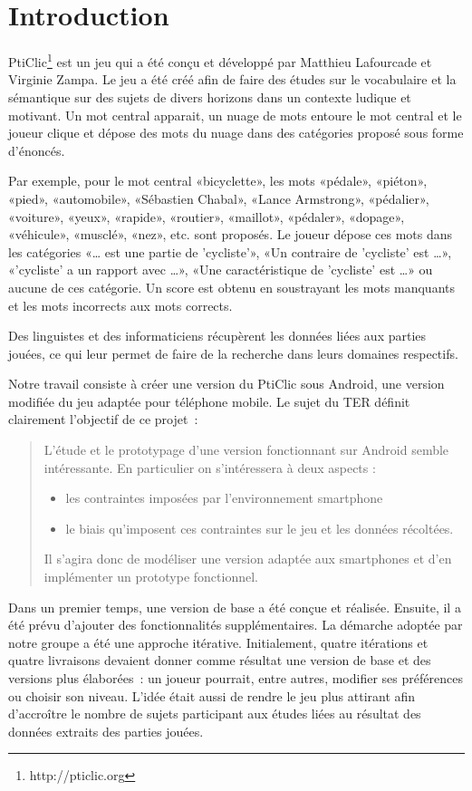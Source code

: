 \documentclass[a4paper,11pt,french]{article}
\def\android{Android\texttrademark{}}
\begin{document}
\section{Introduction}

PtiClic\footnote{http://pticlic.org} est un jeu qui a été conçu et développé par Matthieu Lafourcade et Virginie Zampa. Le jeu a été créé afin de faire des études sur le vocabulaire et la sémantique sur des sujets de divers horizons dans un contexte ludique et motivant. Un mot central apparait, un nuage de mots entoure le mot central et le joueur clique et dépose des mots du nuage dans des catégories proposé sous forme d'énoncés. 

Par exemple, pour le mot central «bicyclette», les mots «pédale», «piéton», «pied», «automobile», «Sébastien Chabal», «Lance Armstrong», «pédalier», «voiture», «yeux», «rapide», «routier», «maillot», «pédaler», «dopage», «véhicule», «musclé», «nez», etc. sont proposés. Le joueur dépose ces mots dans les catégories «\dots{} est une partie de 'cycliste'», «Un contraire de 'cycliste' est \dots{}», «'cycliste' a un rapport avec \dots{}»,  «Une caractéristique de 'cycliste' est \dots{}» ou aucune de ces catégorie. Un score est obtenu en soustrayant les mots manquants et les mots incorrects aux mots corrects. 

Des linguistes et des informaticiens récupèrent les données liées aux parties jouées, ce qui leur permet de faire de la recherche dans leurs domaines respectifs.

Notre travail consiste à créer une version du PtiClic sous \android{}, une version modifiée du jeu adaptée pour téléphone mobile. Le sujet du TER définit clairement l'objectif de ce projet~:

\begin{quotation}
\noindent  L'étude et le prototypage d'une version fonctionnant sur \android{} semble intéressante. En particulier on s'intéressera à deux aspects :
  \begin{itemize}
  \item les contraintes imposées par l'environnement smartphone
  \item le biais qu'imposent ces contraintes sur le jeu et les données récoltées.
  \end{itemize}
  
\noindent  Il s'agira donc de modéliser une version adaptée aux smartphones et d'en implémenter un prototype fonctionnel.
\end{quotation}

Dans un premier temps, une version de base a été conçue et réalisée. Ensuite, il a été prévu d'ajouter des fonctionnalités supplémentaires. La démarche adoptée par notre groupe a été une approche itérative. Initialement, quatre itérations et quatre livraisons devaient donner comme résultat une version de base et des versions plus élaborées~: un joueur pourrait, entre autres, modifier ses préférences ou choisir son niveau. L'idée était aussi de rendre le jeu plus attirant afin d'accroître le nombre de sujets participant aux études liées au résultat des données extraits des parties jouées.
\end{document}

